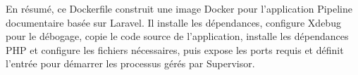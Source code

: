 En résumé, ce Dockerfile construit une image Docker pour l'application Pipeline documentaire basée sur Laravel. Il installe les dépendances, configure Xdebug pour le débogage, copie le code source de l'application, installe les dépendances PHP et configure les fichiers nécessaires, puis expose les ports requis et définit l'entrée pour démarrer les processus gérés par Supervisor.